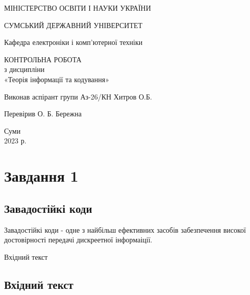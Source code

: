 \documentclass[a4paper,14pt]{extreport}
\begin{document}
\begin{titlepage}
	\begin{center}
		\large
		МІНІСТЕРСТВО ОСВІТИ І НАУКИ УКРАЇНИ
		
		\vspace{0.5cm}
		
		СУМСЬКИЙ ДЕРЖАВНИЙ УНІВЕРСИТЕТ\\
		
		\vspace{0.25cm}
		
		Кафедра електроніки і комп'ютерної техніки
		\vspace{2.5cm}
		\vfill
		
		\textsc{КОНТРОЛЬНА РОБОТА}\\[2mm]
		
		з дисципліни \\«Теорія інформації та кодування»
		\vfill
		
	
		
	\end{center}
	\vfill
	
	\newlength{\ML}
	\settowidth{\ML}{}
	Виконав аспірант групи Аз-26/КН Хитров О.Б.
	\bigskip
	

	Перевірив О. Б. Бережна
	\vfill
	
	\vspace{5cm}
	
	\begin{center}
		Суми\\ 2023 р.
	\end{center}
	
\end{titlepage}
	
\section{Завдання 1}
	
\subsection{Завадостійкі коди}
	Завадостійкі коди - одне з найбільш ефективних засобів забезпечення високої достовірності передачі дискреетної інформаіції.

Вхідний текст

\subsection{Вхідний текст}
\end{document}
